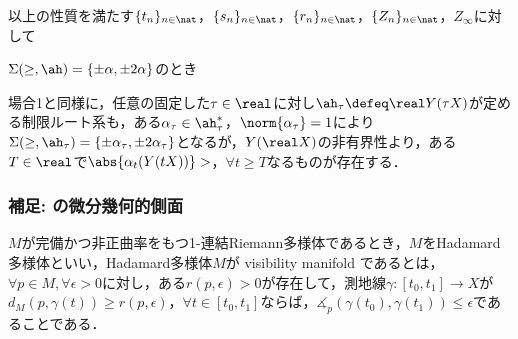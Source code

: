 \begin{pfwn}{}
\begin{case}
    以上の性質を満たす$\{t_n\}_{n\in \nat} $，$\{s_n\}_{n\in \nat}  $，$\{r_n \}_{n\in \nat} $，$\{Z_{n} \}_{n\in \nat} $，$Z_{\infty} $に対して

    
    
  \end{case}

  \begin{case}
    $\Sigma(\ge,\ah) = \{\pm\alpha,\pm 2\alpha \}$のとき

    場合1と同様に，任意の固定した$\tau \in \real$に対し$\ah_{\tau} \defeq \real Y(\tau X)$が定める制限ルート系も，ある$\alpha_{\tau} \in \ah_{\tau}^{*}$，$ \norm{\alpha_{\tau}} = 1 $により$\Sigma(\ge,\ah_{\tau}) = \{\pm\alpha_{\tau}, \pm 2\alpha_{\tau} \}$となるが，$Y(\real X) $の非有界性より，ある$T\in \real$で$\abs{\alpha_{t}(Y(tX))} >  $，$\forall t \geq T$なるものが存在する．
    
    
  \end{case}
  
\end{pfwn}


\subsubsection{補足: の微分幾何的側面}
\begin{defi}{\cite[Definition~1.3]{e72-1}}\label{def:visibility}

  $M$が完備かつ非正曲率をもつ1-連結Riemann多様体であるとき，$M$をHadamard多様体といい，Hadamard多様体$M$が visibility manifold であるとは，$\forall p\in M, \forall \epsilon > 0$に対し，ある$r(p,\epsilon) >0 $が存在して，測地線$\gamma\colon [t_0, t_1]\to X $が$d_{M}(p, \gamma(t))\geq r(p,\epsilon) $，$\forall t\in [t_0, t_1]$ならば，$\measuredangle_{p}(\gamma(t_0), \gamma(t_1)) \leq \epsilon $であることである．
\end{defi}

